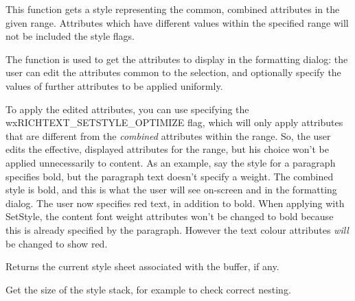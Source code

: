 \label{wxrichtextbuffergetstyleforrange}


This function gets a style representing the common, combined attributes in the given range.
Attributes which have different values within the specified range will not be included the style
flags.

The function is used to get the attributes to display in the formatting dialog: the user
can edit the attributes common to the selection, and optionally specify the values of further
attributes to be applied uniformly.

To apply the edited attributes, you can use  specifying
the wxRICHTEXT\_SETSTYLE\_OPTIMIZE flag, which will only apply attributes that are different
from the {\it combined} attributes within the range. So, the user edits the effective, displayed attributes
for the range, but his choice won't be applied unnecessarily to content. As an example,
say the style for a paragraph specifies bold, but the paragraph text doesn't specify a weight. The
combined style is bold, and this is what the user will see on-screen and in the formatting
dialog. The user now specifies red text, in addition to bold. When applying with
SetStyle, the content font weight attributes won't be changed to bold because this is already specified
by the paragraph. However the text colour attributes {\it will} be changed to
show red.

\label{wxrichtextbuffergetstylesheet}


Returns the current style sheet associated with the buffer, if any.

\label{wxrichtextbuffergetstylestacksize}


Get the size of the style stack, for example to check correct nesting.

\label{wxrichtextbuffergetuncombinedstyle}



